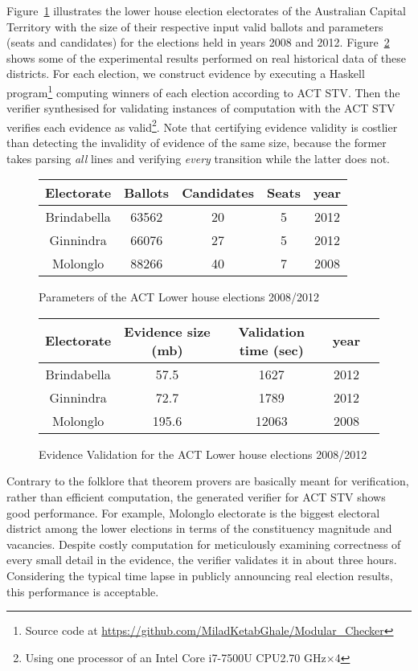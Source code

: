 \documentclass[10pt,conference]{IEEEtran}
\begin{document}
Figure~\ref{ParamACT} illustrates the lower house election
electorates of the Australian Capital Territory with the size of
their respective input valid ballots and parameters (seats and
candidates) for the elections held in years 2008 and 2012.
Figure~\ref{EvACT} shows some of the experimental results performed
on real historical data of these districts. For each election, we
construct evidence  by executing a Haskell program\footnote{Source code at \url{https://github.com/MiladKetabGhale/Modular_Checker}} computing winners of each election  according to ACT STV. Then the verifier synthesised for validating instances of computation with the ACT STV verifies each evidence as valid\footnote{Using one processor of an Intel Core i7-7500U CPU\@ 2.70 GHz$\times$4}. Note that certifying evidence  validity is costlier than detecting the invalidity of evidence of the same size, because the former takes parsing  \emph{all} lines and verifying \emph{every} transition  while the latter does not. 
\begin{figure}[t]
\centering
\begin{small}
\begin{tabular}{|c | c | c | c | c|}
\hline
Electorate&Ballots&Candidates&Seats&year\\
\hline
Brindabella&63562&20&5&2012\\
\hline
Ginnindra&66076&27&5&2012\\
\hline
Molonglo&88266&40&7&2008\\
\hline
\end{tabular}
\end{small} 
\caption{Parameters of the ACT Lower house elections 2008/2012} 
\label{ParamACT}
\end{figure}
\begin{figure}[h]
\centering
\begin{small}
\begin{tabular}{|c | c | c | c | c|}
\hline
Electorate&Evidence size (mb)&Validation time (sec)&year\\
\hline
Brindabella&57.5&1627&2012\\
\hline
Ginnindra&72.7&1789&2012\\
\hline
Molonglo&195.6&12063&2008\\
\hline
\end{tabular}
\end{small} 
\caption{Evidence Validation for the ACT Lower house elections 2008/2012}
\label{EvACT} 
\end{figure}
Contrary to the folklore that theorem provers are basically meant
for verification, rather than efficient computation, the generated
verifier for ACT STV shows good performance. For example, Molonglo electorate is the biggest electoral district among the lower elections in terms of the constituency magnitude and vacancies. Despite  costly computation for meticulously examining correctness of every small detail in the evidence, the verifier validates it in about three hours. Considering the typical time lapse in publicly announcing real election results, this performance is acceptable.  
\end{document}
